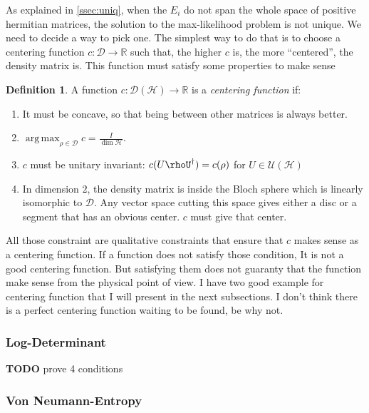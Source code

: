 \documentclass[10pt]{report}
\theoremstyle{plain}
\theoremstyle{definition}
\newtheorem{defn}{Definition}[chapter]
\theoremstyle{remark}
\newcommand{\R}{\ensuremath{\mathbb{R}}}
\newcommand{\TODO}{\textbf{TODO}}
\DeclareMathOperator{\argmax}{arg\,max}
\begin{document}
As explained in \cref{ssec:uniq}, when the $E_i$ do not span the whole space of
positive hermitian matrices, the solution to the max-likelihood problem is not
unique. We need to decide a way to pick one. The simplest way to do that is to
choose a centering function $c : \mathcal{D} \to \R$ such that, the higher $c$
is, the more ``centered'', the density matrix is. This function must satisfy
some properties to make sense

\begin{defn}
  A function $c : \mathcal{D}(\mathcal{H}) \to \R$ is a \emph{centering function} if:

  \begin{enumerate}
  \item It must be concave, so that being between other matrices is always better.
  \item $\displaystyle \argmax_{\rho \in \mathcal{D}} c = \frac I{\dim
      \mathcal{H}}$.
  \item $c$ must be unitary invariant: $c(U\rhoU^\dagger) = c(\rho)$ for $U \in \mathcal{U}(\mathcal{H})$
  \item In dimension $2$, the density matrix is inside the Bloch sphere which is
    linearly isomorphic to $\mathcal{D}$. Any vector space cutting this space
    gives either a disc or a segment that has an obvious center. $c$ must give
    that center.
  \end{enumerate}
\end{defn}

All those constraint are qualitative constraints that ensure that $c$ makes sense
as a centering function. If a function does not satisfy those condition, It is
not a good centering function. But satisfying them does not guaranty that the function
make sense from the physical point of view. I have two good example for
centering function that I will present in the next subsections. I don't think
there is a perfect centering function waiting to be found, be why not.

\subsubsection{Log-Determinant}

\TODO{} prove 4 conditions

\subsubsection{Von Neumann-Entropy}
\end{document}
